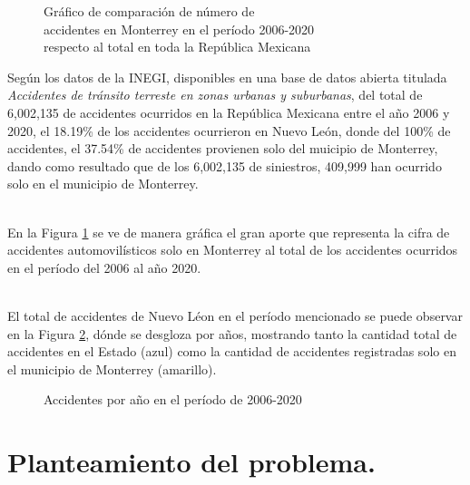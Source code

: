 \documentclass[a4paper]{article}
\begin{document}
\noindent\begin{minipage}{0.5\textwidth}%
\begin{figure}[H]
    \centering

    \caption{Gráfico de comparación de número de\\accidentes en Monterrey en el período 2006-2020\\respecto al total en toda la República Mexicana\\\autocite{DatosInegiDeVerdad}}
    \label{fig:Aporte}
\end{figure}
\end{minipage}%
\hfill%
\begin{minipage}{0.5\textwidth}
Según los datos de la INEGI, disponibles en una base de datos abierta titulada \textit{Accidentes de tránsito terreste en zonas urbanas y suburbanas}, del total de 6,002,135 de accidentes ocurridos en la República Mexicana entre el año 2006 y 2020, el 18.19\% de los accidentes ocurrieron en Nuevo León, donde del 100\% de accidentes, el 37.54\% de accidentes provienen solo del muicipio de Monterrey, dando como resultado que de los 6,002,135 de siniestros, 409,999 han ocurrido solo en el municipio de Monterrey. 

\hspace{0pt}\\
En la Figura \ref{fig:Aporte} se ve de manera gráfica el gran aporte que representa la cifra de accidentes automovilísticos solo en Monterrey al total de los accidentes ocurridos en el período del 2006 al año 2020. 

\autocite{DatosInegiDeVerdad}
\end{minipage}

\hspace{0pt}\\
El total de accidentes de Nuevo Léon en el período mencionado se puede observar en la Figura \ref{fig:Acc}, dónde se desgloza por años, mostrando tanto la cantidad total de accidentes en el Estado (azul) como la cantidad de accidentes registradas solo en el municipio de Monterrey (amarillo).

\begin{figure}[H]
    \centering

    \caption{Accidentes por año en el período de 2006-2020\\\autocite{DatosInegiDeVerdad}}
    \label{fig:Acc}
\end{figure}


\section{Planteamiento del problema.}
\end{document}
